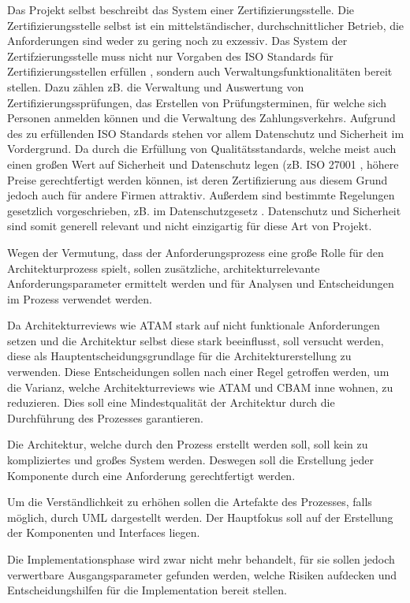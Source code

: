 Das Projekt selbst beschreibt das System einer Zertifizierungsstelle. Die Zertifizierungsstelle selbst ist ein mittelständischer, durchschnittlicher Betrieb, die Anforderungen sind weder zu gering noch zu exzessiv. Das System der Zertifzierungsstelle muss nicht nur Vorgaben des ISO Standards für Zertifizierungsstellen erfüllen \cite{ISO_CERT}, sondern auch Verwaltungsfunktionalitäten bereit stellen. Dazu zählen zB. die Verwaltung und Auswertung von Zertifizierungssprüfungen, das Erstellen von Prüfungsterminen, für welche sich Personen anmelden können und die Verwaltung des Zahlungsverkehrs. Aufgrund des zu erfüllenden ISO Standards stehen vor allem Datenschutz und Sicherheit im Vordergrund. Da durch die Erfüllung von Qualitätsstandards, welche meist auch einen großen Wert auf Sicherheit und Datenschutz legen (zB. ISO 27001 \cite{ISO_SEC}, höhere Preise gerechtfertigt werden können, ist deren Zertifizierung aus diesem Grund jedoch auch für andere Firmen attraktiv. Außerdem sind bestimmte Regelungen gesetzlich vorgeschrieben, zB. im Datenschutzgesetz \cite[§ 14]{datenschutz}. Datenschutz und Sicherheit sind somit generell relevant und nicht einzigartig für diese Art von Projekt.

Wegen der Vermutung, dass der Anforderungsprozess eine große Rolle für den Architekturprozess spielt, sollen zusätzliche, architekturrelevante Anforderungsparameter ermittelt werden und für Analysen und Entscheidungen im Prozess verwendet werden.

Da Architekturreviews wie ATAM stark auf nicht funktionale Anforderungen setzen und die Architektur selbst diese stark beeinflusst, soll versucht werden, diese als Hauptentscheidungsgrundlage für die Architekturerstellung zu verwenden. Diese Entscheidungen sollen nach einer Regel getroffen werden, um die Varianz, welche Architekturreviews wie ATAM und CBAM inne wohnen, zu reduzieren. Dies soll eine Mindestqualität der Architektur durch die Durchführung des Prozesses garantieren.

Die Architektur, welche durch den Prozess erstellt werden soll, soll kein zu kompliziertes und großes System werden. Deswegen soll die Erstellung jeder Komponente durch eine Anforderung gerechtfertigt werden.

Um die Verständlichkeit zu erhöhen sollen die Artefakte des Prozesses, falls möglich, durch UML dargestellt werden. Der Hauptfokus soll auf der Erstellung der Komponenten und Interfaces liegen.

Die Implementationsphase wird zwar nicht mehr behandelt, für sie sollen jedoch verwertbare Ausgangsparameter gefunden werden, welche Risiken aufdecken und Entscheidungshilfen für die Implementation bereit stellen.


